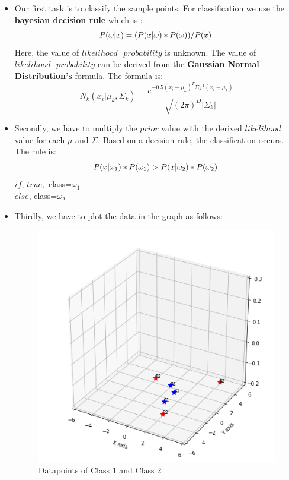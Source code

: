 \documentclass[conference]{IEEEtran}
\begin{document}
\begin{itemize}  
\item Our first task is to classify the sample points. For classification we use the \textbf{bayesian decision rule} which is :\\

\begin{equation}
P(\omega|x)=(P(x|\omega)*P(\omega))/P(x)\textrm{   }\\
\end{equation}
Here, the value of $likelihood\textrm{ }probability$ is unknown. The value of $likelihood\textrm{ }probability$ can be derived from the \textbf{Gaussian Normal Distribution's} formula. The formula is:\\
\begin{equation}
N_k(x_i|\mu_k,\Sigma_k)= \frac{e^{-0.5(x_i-\mu_k)^T\Sigma_k^{-1}(x_i-\mu_k)}}{\sqrt{(2\pi)^D|\Sigma_k|}}
\end{equation}
\item Secondly, we have to multiply the $prior$ value with the derived $likelihood$ value for each $\mu$ and $\Sigma$. Based on a decision rule, the classification occurs. The rule is:\\
\begin{equation}
P(x|\omega_1)*P(\omega_1)>P(x|\omega_2)*P(\omega_2)\textrm{   }\\
\end{equation}
$if \textrm{,   }true,$ class=$\omega_1$\\
$else \textrm{,   }$class=$\omega_2$\\
\item Thirdly, we have to plot the data in the graph as follows:\\
\begin{figure}[htbp]
\centerline{\includegraphics[scale=0.4673]{31.png}}
\caption{Datapoints of Class 1 and Class 2\\}
\label{fig}
\end{figure}



\end{itemize}
\end{document}
